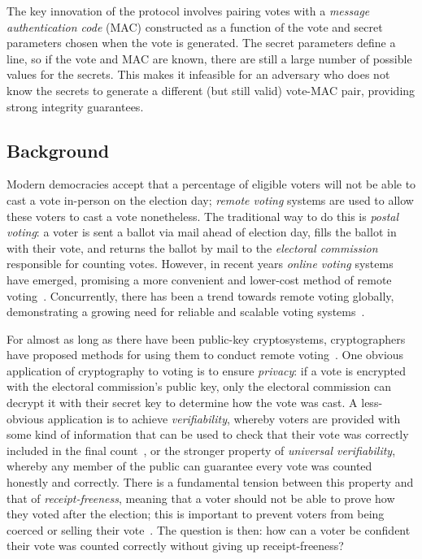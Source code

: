 \documentclass[12pt,a4paper]{article}
\theoremstyle{definition}
\begin{document}
The key innovation of the protocol involves pairing votes with a \textit{message authentication code} (MAC) constructed as a function of the vote and secret parameters chosen when the vote is generated. The secret parameters define a line, so if the vote and MAC are known, there are still a large number of possible values for the secrets. This makes it infeasible for an adversary who does not know the secrets to generate a different (but still valid) vote-MAC pair, providing strong integrity guarantees.

\subsection{Background}\label{sec-background}
Modern democracies accept that a percentage of eligible voters will not be able to cast a vote in-person on the election day; \textit{remote voting} systems are used to allow these voters to cast a vote nonetheless. The traditional way to do this is \textit{postal voting}: a voter is sent a ballot via mail ahead of election day, fills the ballot in with their vote, and returns the ballot by mail to the \textit{electoral commission} responsible for counting votes. However, in recent years \textit{online voting} systems have emerged, promising a more convenient and lower-cost method of remote voting~\cite{nswivote,scytlsvote}. Concurrently, there has been a trend towards remote voting globally, demonstrating a growing need for reliable and scalable voting systems~\cite{VEC_PostalVoting_Position,rallings2010,gjosteen2011norwegian}.

For almost as long as there have been public-key cryptosystems, cryptographers have proposed methods for using them to conduct remote voting~\cite{cohen1985robust}. One obvious application of cryptography to voting is to ensure \textit{privacy}: if a vote is encrypted with the electoral commission's public key, only the electoral commission can decrypt it with their secret key to determine how the vote was cast. A less-obvious application is to achieve \textit{verifiability}, whereby voters are provided with some kind of information that can be used to check that their vote was correctly included in the final count~\cite{benaloh1987verifiable}, or the stronger property of \textit{universal verifiability}, whereby any member of the public can guarantee every vote was counted honestly and correctly. There is a fundamental tension between this property and that of \textit{receipt-freeness}, meaning that a voter should not be able to prove how they voted after the election; this is important to prevent voters from being coerced or selling their vote~\cite{benaloh1994receipt}. The question is then: how can a voter be confident their vote was counted correctly without giving up receipt-freeness?
\end{document}

